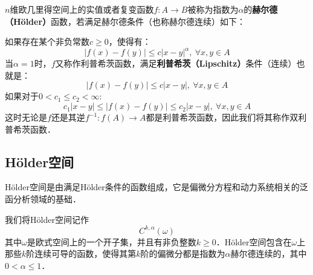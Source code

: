 \begin{issues}
\issueDraft
\end{issues}
$n$维欧几里得空间上的实值或者复变函数$f:A \rightarrow B$被称为指数为$\alpha$的\textbf{赫尔德（Hölder）}函数，若满足赫尔德条件（也称赫尔德连续）如下：

如果存在某个非负常数$c\geq 0$，使得有：
\begin{equation}
|f(x)-f(y)|\leq c|x-y|^\alpha,\ \forall x,y \in A
\end{equation}
当$\alpha=1$时，$f$又称作利普希茨函数，满足\textbf{利普希茨（Lipschitz）}条件（连续）也就是：
\begin{equation}
|f(x)-f(y)|\leq c|x-y|,\ \forall x,y \in A
\end{equation}
如果对于$0<c_1\leq c_2<\infty $:
\begin{equation}
c_1|x-y|\leq |f(x)-f(y)|\leq  c_2|x-y|,\ \forall x,y \in A
\end{equation}
这时无论是$f$还是其逆$f^{-1}:f(A)\rightarrow A$都是利普希茨函数，因此我们将其称作双利普希茨函数．

\subsection{Hölder空间}
Hölder空间是由满足Hölder条件的函数组成，它是偏微分方程和动力系统相关的泛函分析领域的基础．

我们将Hölder空间记作
\begin{equation}
C^{k,\alpha}(\omega)
\end{equation}
其中$\omega$是欧式空间上的一个开子集，并且有非负整数$k\geq 0$．Hölder空间包含在$\omega$上那些$k$阶连续可导的函数，使得其第$k$阶的偏微分都是指数为$\alpha$赫尔德连续的，其中$0<\alpha\leq 1$．
